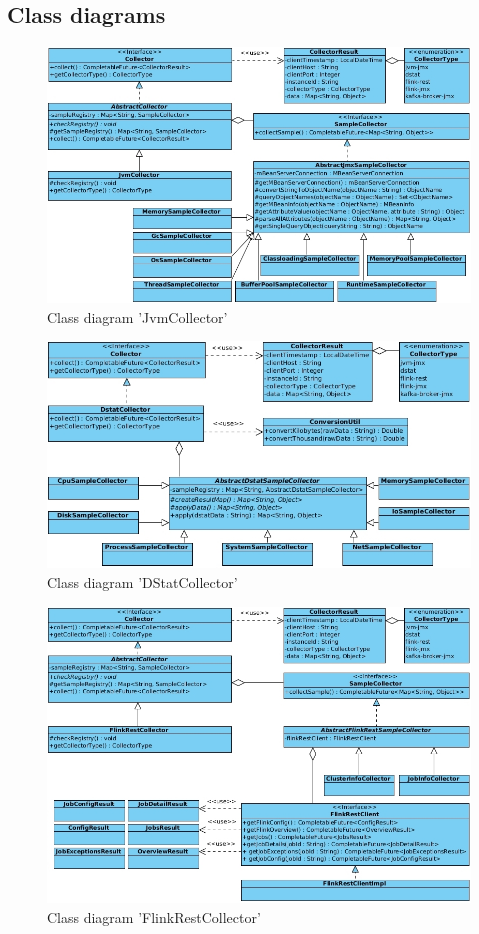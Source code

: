 \subsection{Class diagrams}
\begin{figure}[H]
	\centering
	\includegraphics[width=1.0\textwidth]{../uml/class-jvm-collector.jpg}
	\caption{Class diagram 'JvmCollector'}
	\label{class-diagram-jvm-collector}
\end{figure}
\begin{figure}[H]
	\centering
	\includegraphics[width=1.0\textwidth]{../uml/class-dstat-collector.jpg}
	\caption{Class diagram 'DStatCollector'}
	\label{class-diagram-dstat-collector}
\end{figure}
\begin{figure}[H]
	\centering
	\includegraphics[width=1.0\textwidth]{../uml/class-flink-rest-collector.jpg}
	\caption{Class diagram 'FlinkRestCollector'}
	\label{class-diagram-flink-rest-collector}
\end{figure}
